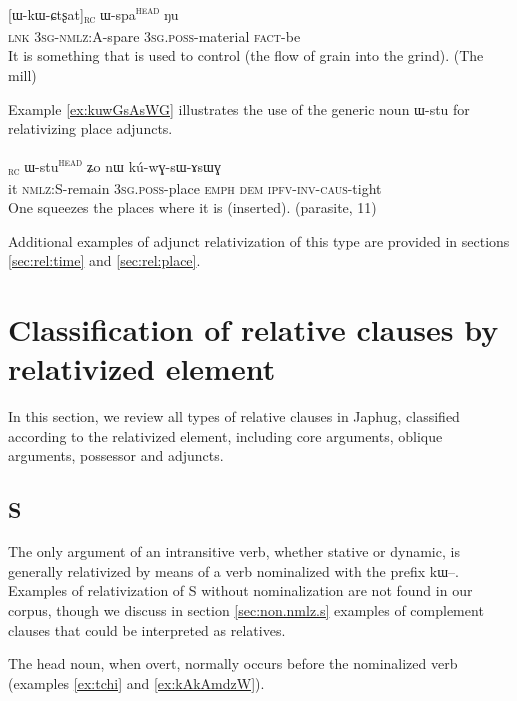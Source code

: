 \documentclass[oldfontcommands,oneside,a4paper,11pt]{article}
\newcommand{\ipa}[1]{{\phon #1}} %
\newcommand{\topic}{\textsc{dem}}
\newcommand{\tete}{\textsuperscript{\textsc{head}}}
\newcommand{\rc}{\textsubscript{\textsc{rc}}}
\begin{document}
     \begin{exe}
   \ex \label{ex:wkwctsxat}
 \gll \ipa{tɕe}   	[\ipa{ɯ-kɯ-ɕtʂat}]\rc{}   	\ipa{ɯ-spa}\tete{}   	\ipa{ŋu}        \\
\textsc{lnk} \textsc{3sg-nmlz:A}-spare  \textsc{3sg.poss}-material \textsc{fact}-be\\
\glt  It is something that is used to control (the flow of grain into the grind). (The mill)
\end{exe}



Example \ref{ex:kuwGsAsWG} illustrates the use of the generic noun \ipa{ɯ-stu} for relativizing place adjuncts.

\begin{exe}
\ex \label{ex:kuwGsAsWG}
\gll
[\ipa{ɯʑo}  	\ipa{kɯ-rɤʑi}]\rc{}  	\ipa{ɯ-stu}\tete{} \ipa{ʑo} 	\ipa{nɯ}  	\ipa{kú-wɣ-sɯ-ɤsɯɣ}  \\
it \textsc{nmlz:S}-remain \textsc{3sg.poss}-place \textsc{emph} \topic{}  \textsc{ipfv-inv-caus}-tight \\
\glt One squeezes the places where it is (inserted). (parasite, 11)
  \end{exe}

Additional examples of adjunct relativization of this type are provided in sections \ref{sec:rel:time} and \ref{sec:rel:place}.

\section{Classification of relative clauses by relativized element} 

In this section, we review all types of relative clauses in Japhug, classified according to the relativized element, including core arguments, oblique arguments, possessor and adjuncts.

\subsection{S} \label{sec:s.rel}
The only argument of an intransitive verb, whether stative or dynamic, is generally relativized by means of a verb nominalized with the prefix \ipa{kɯ}--. Examples of relativization of S without nominalization are   not found in our corpus, though we discuss in section \ref{sec:non.nmlz.s} examples of complement clauses that could be interpreted as relatives.

The head noun, when overt, normally occurs   before the nominalized verb (examples \ref{ex:tchi} and \ref{ex:kAkAmdzW}). 
\end{document}

